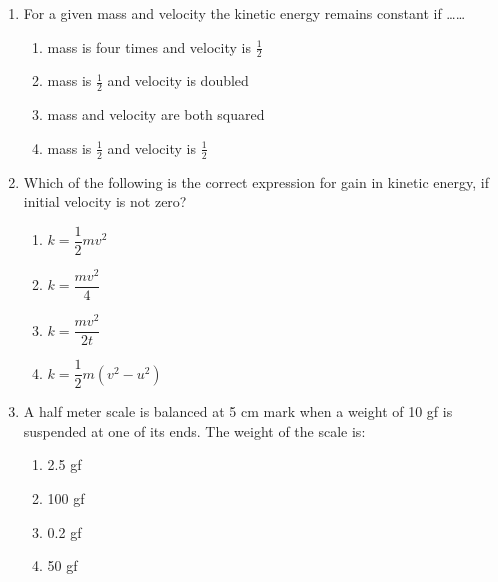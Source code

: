 \begin{enumerate}[label=(\roman*)]

    \item For a given mass and velocity the kinetic energy remains constant
        if \dots \dots

        \begin{enumerate}[label=(\alph*)]
            \setlength\itemsep{0em}
            \item mass is four times and velocity is $\frac12$
            \item mass is $\frac12$ and velocity is doubled
            \item mass and velocity are both squared
            \item mass is $\frac12$ and velocity is $\frac12$
        \end{enumerate}

    \item Which of the following is the correct expression for gain in 
        kinetic energy, if initial velocity is not zero?

        \begin{multicols}{2}
        \begin{enumerate}[label=(\alph*)]
            \item $k = \dfrac{1}{2}mv^2$
            \item $k = \dfrac{mv^2}{4}$
            \item $k = \dfrac{mv^2}{2t}$
            \item $k = \dfrac{1}{2}m(v^2-u^2)$
        \end{enumerate}
        \end{multicols}

    \item A half meter scale is balanced at 5 cm mark when a 
        weight of 10 gf is suspended at one of its ends. The weight 
        of the scale is:

        \begin{multicols}{4}
        \begin{enumerate}[label=(\alph*)]
            \item 2.5 gf
            \item 100 gf
            \item 0.2 gf
            \item 50 gf
        \end{enumerate}
        \end{multicols}


\end{enumerate}
